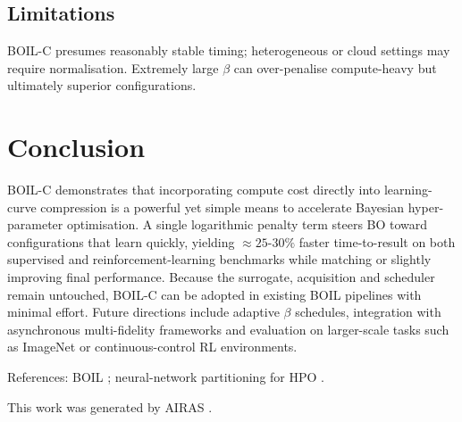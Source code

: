 \documentclass{article} %
\begin{document}
\subsection{Limitations}
BOIL-C presumes reasonably stable timing; heterogeneous or cloud settings may require normalisation. Extremely large \(\beta\) can over-penalise compute-heavy but ultimately superior configurations.

\section{Conclusion}
\label{sec:conclusion}
BOIL-C demonstrates that incorporating compute cost directly into learning-curve compression is a powerful yet simple means to accelerate Bayesian hyper-parameter optimisation. A single logarithmic penalty term steers BO toward configurations that learn quickly, yielding \(\approx 25\text{-}30\%\) faster time-to-result on both supervised and reinforcement-learning benchmarks while matching or slightly improving final performance. Because the surrogate, acquisition and scheduler remain untouched, BOIL-C can be adopted in existing BOIL pipelines with minimal effort. Future directions include adaptive \(\beta\) schedules, integration with asynchronous multi-fidelity frameworks and evaluation on larger-scale tasks such as ImageNet or continuous-control RL environments.

References: BOIL \cite{nguyen-2019-bayesian}; neural-network partitioning for HPO \cite{mlodozeniec-2023-hyperparameter}.

This work was generated by \textsc{AIRAS} \citep{airas2025}.



\end{document}
